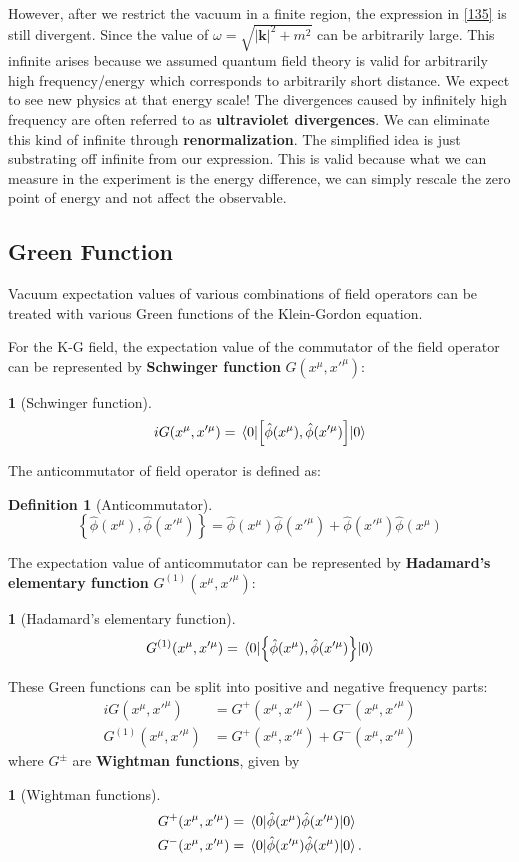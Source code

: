 \documentclass[12pt]{article}
\numberwithin{equation}{section}
\theoremstyle{1style}
\newtheorem{definition}[equation]{Definition}
\newtheorem{cthm}[equation]{}
\newcommand{\tbf}[1]{\textbf{#1}}
\begin{document}
However, after we restrict the vacuum in a finite region, the expression in \ref{135} is still divergent.
Since the value of \(\omega=\sqrt{|\mathbf{k}|^2+m^2}\) can be arbitrarily large.
This infinite arises because we assumed quantum field theory is valid for arbitrarily high frequency/energy
which corresponds to arbitrarily short distance. We expect to see new physics at that energy scale!
The divergences caused by infinitely high frequency are often referred to as \tbf{ultraviolet divergences}.
We can eliminate this kind of infinite through \tbf{renormalization}.
The simplified idea is just substrating off infinite from our expression.
This is valid because what we can measure in the experiment is the energy difference,
we can simply rescale the zero point of energy and not affect the observable.




\subsection{Green Function}
Vacuum expectation values of various combinations of field operators can be treated with various Green functions of the Klein-Gordon equation.

For the K-G field, the expectation value of the commutator of the field operator can be represented by \tbf{Schwinger function} \(G(x^{\mu},x'^{\mu})\):
\begin{cthm}[Schwinger function]
  \[iG(x^{\mu},x'^{\mu})=\expval{\left[\hat{\phi}(x^{\mu}),\hat{\phi}(x'^{\mu})\right]}{0}\]
\end{cthm}
The anticommutator of field operator is defined as:
\begin{definition}[Anticommutator]
  \[\left\{\hat{\phi}(x^{\mu}),\hat{\phi}(x'^{\mu})\right\}=\hat{\phi}(x^{\mu})\hat{\phi}(x'^{\mu})+\hat{\phi}(x'^{\mu})\hat{\phi}(x^{\mu})\]
\end{definition}
The expectation value of anticommutator can be represented by \tbf{Hadamard's elementary function} \(G^{(1)}(x^{\mu},x'^{\mu})\):
\begin{cthm}[Hadamard's elementary function]
  \[G^{(1)}(x^{\mu},x'^{\mu})=\expval{\left\{\hat{\phi}(x^{\mu}),\hat{\phi}(x'^{\mu})\right\}}{0}\]
\end{cthm}
These Green functions can be split into positive and negative frequency parts:
\begin{align}
  iG(x^{\mu},x'^{\mu})      & = G^+(x^{\mu},x'^{\mu})-G^-(x^{\mu},x'^{\mu}) \\
  G^{(1)}(x^{\mu},x'^{\mu}) & =G^+(x^{\mu},x'^{\mu})+G^-(x^{\mu},x'^{\mu})
\end{align}
where \(G^{\pm}\) are \tbf{Wightman functions}, given by
\begin{cthm}[Wightman functions]
  \begin{align*}
    G^+(x^{\mu},x'^{\mu}) & =\expval{\hat{\phi}(x^{\mu})\hat{\phi}(x'^{\mu})}{0}  \\
    G^-(x^{\mu},x'^{\mu}) & =\expval{\hat{\phi}(x'^{\mu})\hat{\phi}(x^{\mu})}{0}.
  \end{align*}
\end{cthm}
\end{document}
